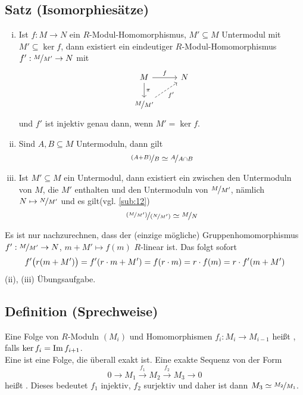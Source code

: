 \subsection{Satz (Isomorphiesätze)} %
\label{sub:29}
\begin{enumerate}[(i)]
	\item Ist $f : M \to N$ ein $R$-Modul-Homomorphismus, $M' \subseteq M$ Untermodul mit $M'  \subseteq \ker f$, dann existiert ein eindeutiger $R$-Modul-Homomorphismus 
	$f'  : \nicefrac{M}{M'} \to N$ mit 
	\[
		\begin{tikzcd}
			M \rar{f} \dar{\pi }& N \\
			\nicefrac{M}{M'} \urar[dashed, swap]{f'}& 
		\end{tikzcd}
	\]
	und $f'$ ist injektiv genau dann, wenn $M' = \ker f$.
	\item Sind $A,B \subseteq M$ Untermoduln, dann gilt 
	\[
		\nicefrac{(A+B)}{B} \simeq \nicefrac{A}{A \cap B}
	\]
	\item Ist $M' \subseteq M$ ein Untermodul, dann existiert ein  zwischen den Untermoduln von $M$, die $M'$ enthalten und den Untermoduln
	von $\nicefrac{M}{M'}$, nämlich $N \mapsto \nicefrac{N}{M'}$ und es gilt\hfill(vgl. \ref{sub:12})
	\[
		\nicefrac{\enbrace*{\nicefrac{M}{M'}} }{\enbrace*{\nicefrac{N}{M'}} } \simeq \nicefrac{M}{N}
	\] 
\end{enumerate}
Es ist nur nachzurechnen, dass der (einzige mögliche) Gruppenhomomorphismus $f' : \nicefrac{M}{M'} \to N$, $m + M' \mapsto f(m)$ $R$-linear ist. Das folgt sofort
\begin{align*}
	f' \enbrace[\big]{r(m + M')} = f' (r \cdot m + M')= f(r \cdot m) = r \cdot f(m) = r \cdot f'(m+ M')
\end{align*} 
(ii), (iii) Übungsaufgabe. \bewende

\subsection[Definition: Exakte Sequenz]{Definition (Sprechweise)} %
\label{sub:210}
Eine Folge von $R$-Moduln $(M_i)$ und Homomorphismen $f_i : M_i \to M_{i-1}$ heißt , falls $\ker f_i = \im f_{i+1}$.\\
Eine  ist eine Folge, die überall exakt ist. Eine exakte Sequenz von der Form 
\[
	0 \to M_1 \xrightarrow{f_1} M_2  \xrightarrow{f_2} M_3 \to 0  
\]
heißt . Dieses bedeutet $f_1$ injektiv, $f_2$ surjektiv und daher ist dann $M_3 \simeq \nicefrac{M_2}{M_1}$.

